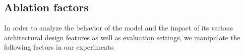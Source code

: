 
\subsection{Ablation factors}
\label{sec:ablation-factors}

In order to analyze the behavior of the model and the impact of its various 
architectural design features as well as evaluation settings, we manipulate 
the following factors in our experiments. 

